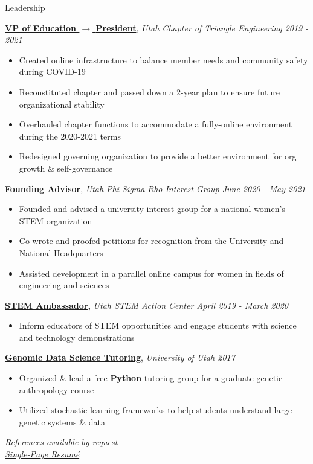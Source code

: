 \documentclass{resume/resume}
\begin{document}

\begin{rSection}{Leadership}
 
    \href{https://github.com/UtahTriangle/Laws}{\bf VP of Education $\rightarrow$ \bf President}, {\em Utah Chapter of Triangle Engineering \hfill 2019 - 2021}
    \vspace{-6pt}
    \begin{itemize}[nosep]
        \item Created online infrastructure to balance member needs and community safety during COVID-19
        \item Reconstituted chapter and passed down a 2-year plan to ensure future organizational stability
        \item Overhauled chapter functions to accommodate a fully-online environment during the 2020-2021 terms
        \item Redesigned governing organization to provide a better environment for org growth \& self-governance
    \end{itemize}

    {\bf Founding Advisor}, {\em Utah Phi Sigma Rho Interest Group \hfill June 2020 - May 2021}
    \vspace{-6pt}
    \begin{itemize}[nosep]
        \item Founded and advised a university interest group for a national women's STEM organization
        \item Co-wrote and proofed petitions for recognition from the University and National Headquarters
        \item Assisted development in a parallel online campus for women in fields of engineering and sciences
    \end{itemize}
    
    \href{https://stem.utah.gov/students/utah-stem-ambassador-program/}{\bf STEM Ambassador,} {\em Utah STEM Action Center \hfill April 2019 - March 2020}
    \vspace{-6pt}
    \begin{itemize}[nosep]
        \item Inform educators of STEM opportunities and engage students with science and technology demonstrations
    \end{itemize}

    \href{http://content.csbs.utah.edu/~rogers/ant5221/lab/manual.pdf}{\bf Genomic Data Science Tutoring}, {\em University of Utah \hfill 2017}
    \vspace{-6pt}
    \begin{itemize}[nosep]
      \item Organized \& lead a free {\bf Python} tutoring group for a graduate genetic anthropology course
      \item Utilized stochastic learning frameworks to help students understand large genetic systems \& data
    \end{itemize}

\end{rSection}

\vspace{1.2em}
\begin{center}
    {\em References available by request} \\
    {\em \href{https://spelkington.github.io/Elkington_Resume.pdf}{Single-Page Resumé}}
\end{center}
\end{document}

